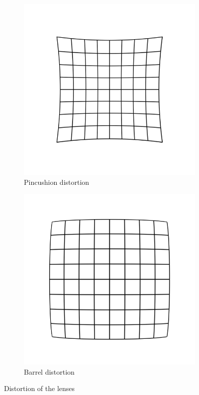 \documentclass[12pt]{article}
\begin{document}
\begin{figure}[h]
        \centering
        \begin{subfigure}[b]{0.3\textwidth}
                \includegraphics[scale=1]{PinDist.png}
                \caption{Pincushion distortion}
                \label{fig:pindist}
        \end{subfigure}
        \begin{subfigure}[b]{0.3\textwidth}
                \includegraphics[scale=1]{BarDist.png}
                \caption{Barrel distortion}
                \label{fig:bardist}
        \end{subfigure}
        \caption{Distortion of the lenses}
        \par
\end{figure}
\end{document}
